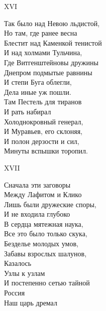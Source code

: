 XVI

Так было над Невою льдистой,\\
Но там, где ранее весна\\
Блестит над Каменкой тенистой\\
И над холмами Тульчина,\\
Где Витгенштейновы дружины\\
Днепром подмытые равнины\\
И степи Буга облегли,\\
Дела иные уж пошли.\\
Там Пестель  для тиранов\\
И рать  набирал\\
Холоднокровный генерал,\\
И Муравьев, его склоняя,\\
И полон дерзости и сил,\\
Минуты вспышки торопил.

XVII

Сначала эти заговоры\\
Между Лафитом и Клико\\
Лишь были дружеские споры,\\
И не входила глубоко\\
В сердца мятежная наука,\\
Все это было только скука,\\
Безделье молодых умов,\\
Забавы взрослых шалунов,\\
Казалось\\                                                                                                                                             
Узлы к узлам\\                                                                                                                                              
И постепенно сетью тайной\\
Россия\\                                                                                                                                              
Наш царь дремал                                                                                                                                              
